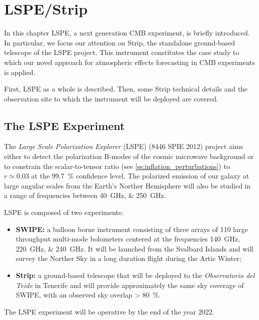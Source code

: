\chapter{LSPE/Strip}\label{ch:lspe_strip}

In this chapter LSPE, a next generation CMB experiment, is briefly
introduced. In particular, we focus our attention on Strip, the standalone
ground-based telescope of the LSPE project. This instrument constitutes the
case study to which our novel approach for atmospheric effects forecasting
in CMB experiments is applied.

First, LSPE as a whole is described. Then, some Strip technical details and
the observation site to which the instrument will be deployed are covered.

\section{The LSPE Experiment}

The \emph{Large Scale Polarization Explorer} (LSPE) (8446 SPIE 2012)
project aims either to detect the polarization B-modes of the cosmic
microwave background or to constrain the scalar-to-tensor ratio (see
\autoref{ss:inflation_perturbations}) to $r \simeq 0.03$ at the
\SI{99.7}{\percent} confidence level. The polarized emission of our galaxy
at large angular scales from the Earth's Norther Hemisphere will also be
studied in a range of frequencies between \SIlist{40;250}{\giga\hertz}.

LSPE is composed of two experiments:

\begin{itemize}
        \item \textbf{SWIPE:} a balloon borne instrument consisting of
        three arrays of \num{110} large throughput multi-mode bolometers
        centered at the frequencies \SIlist{140;220;240}{\giga\hertz}. It
        will be launched from the Svalbard Islands and will survey the Norther
        Sky in a long duration flight during the Artic Winter;

        \item \textbf{Strip:} a ground-based telescope that will be
        deployed to the \emph{Observatorio del Teide} in Tenerife and will
        provide approximately the same sky coverage of SWIPE, with an
        observed sky overlap \SI{> 80}{\percent}.
\end{itemize}

The LSPE experiment will be operative by the end of the year 2022.

